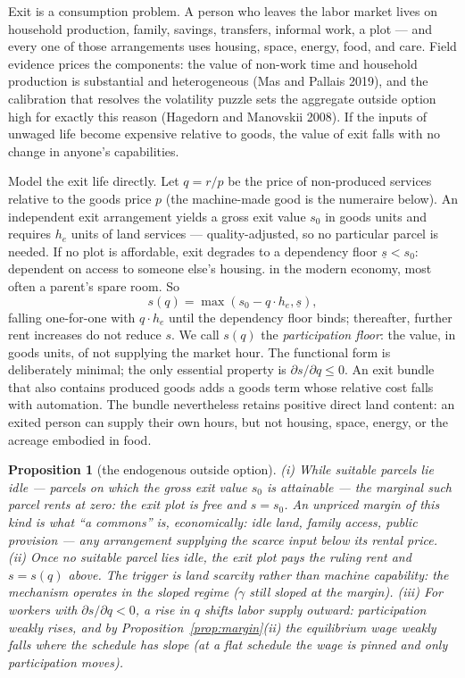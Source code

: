 \documentclass[12pt]{article}
\theoremstyle{plain}
\newtheorem{proposition}{Proposition}
\begin{document}
Exit is a consumption problem. A person who leaves the labor market lives on
household production, family, savings, transfers, informal work, a plot --- and
every one of those arrangements uses housing, space, energy, food, and care.
Field evidence prices the components: the value of non-work time and household
production is substantial and heterogeneous (Mas and Pallais 2019), and the
calibration that resolves the volatility puzzle sets the aggregate outside
option high for exactly this reason (Hagedorn and Manovskii 2008). If the inputs
of unwaged life become expensive relative to goods, the value of exit falls with
no change in anyone's capabilities.

Model the exit life directly. Let $q = r/p$ be the price of non-produced services relative to the goods price $p$ (the machine-made good is the numeraire below). An independent exit arrangement yields a gross exit value $s_0$ in goods units and requires $h_e$ units of land services --- quality-adjusted, so no particular parcel is needed. If no plot is affordable, exit degrades to a dependency floor $\underline{s} < s_0$: dependent on access to someone else's housing. in the modern economy, most often a parent's spare room. So
\begin{equation}\label{eq:exit}
s(q) = \max( s_0 - q\cdot h_e , \underline{s} ),
\end{equation}
falling one-for-one with $q\cdot h_e$ until the dependency floor binds; thereafter, further rent increases do not reduce $s$. We call $s(q)$ the \emph{participation floor}: the value, in goods units, of not supplying the market hour. The functional form is deliberately minimal; the only essential property is $\partial s/\partial q \le 0$. An exit bundle that also contains produced goods adds a goods term whose relative cost falls with automation. The bundle nevertheless retains positive direct land content: an exited person can supply their own hours, but not housing, space, energy, or the acreage embodied in food.

\begin{proposition}[the endogenous outside option]\label{prop:exit}
(i) While suitable parcels lie idle --- parcels on which the gross exit value $s_0$ is attainable --- the marginal such parcel rents at zero: the exit plot is free and $s = s_0$. An unpriced margin of this kind is what ``a commons'' is, economically: idle land, family access, public provision --- any arrangement supplying the scarce input below its rental price. (ii) Once no suitable parcel lies idle, the exit plot pays the ruling rent and $s = s(q)$ above. The trigger is land scarcity rather than machine capability: the mechanism operates in the sloped regime ($\gamma$ still sloped at the margin). (iii) For workers with $\partial s/\partial q < 0$, a rise in $q$ shifts labor supply outward: participation weakly rises, and by Proposition~\ref{prop:margin}(ii) the equilibrium wage weakly falls where the schedule has slope (at a flat schedule the wage is pinned and only participation moves).
\end{proposition}
\end{document}
